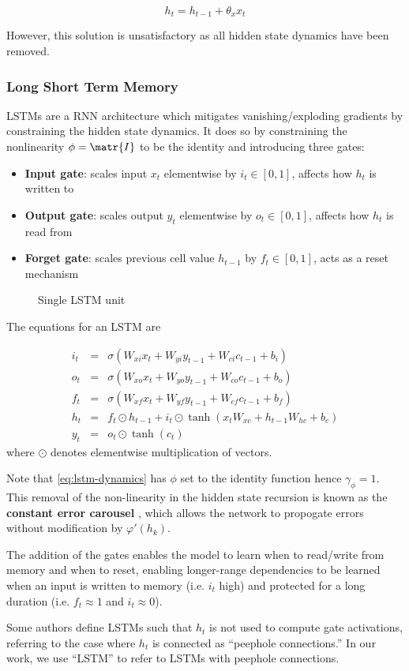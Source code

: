 \begin{equation}
    h_t = h_{t-1} + \theta_x x_t
\end{equation}

However, this solution is unsatisfactory as all hidden state dynamics have been
removed.

\subsubsection{Long Short Term Memory}

LSTMs are a RNN architecture which mitigates vanishing/exploding gradients by constraining
the hidden state dynamics. It does so by constraining the nonlinearity $\phi = \matr{I}$ to be the
identity and introducing three gates:
\begin{itemize}
    \item \textbf{Input gate}: scales input $x_t$ elementwise by $i_t \in [0,1]$, affects how $h_t$ is written to
    \item \textbf{Output gate}: scales output $y_t$ elementwise by $o_t \in [0,1]$, affects how $h_t$ is read from
    \item \textbf{Forget gate}: scales previous cell value $h_{t-1}$ by $f_t \in [0,1]$, acts as a reset mechanism
\end{itemize}

\begin{figure}[htpb]
    \centering
    
    \caption{Single LSTM unit}
    \label{fig:lstm-unit}
\end{figure}

The equations for an LSTM are

\begin{eqnarray}
    i_t &=& \sigma(W_{xi} x_t + W_{yi} y_{t-1} + W_{ci} c_{t-1} + b_i) \\
    o_t &=& \sigma(W_{xo} x_t + W_{yo} y_{t-1} + W_{co} c_{t-1} + b_o) \\
    f_t &=& \sigma(W_{xf} x_t + W_{yf} y_{t-1} + W_{cf} c_{t-1} + b_f) \\
    h_t &=& f_t \odot h_{t-1} + i_t \odot \tanh(x_t W_{xc} + h_{t-1} W_{hc} + b_c) \label{eq:lstm-dynamics} \\
    y_t &=& o_t \odot \tanh(c_t)
\end{eqnarray}
where $\odot$ denotes elementwise multiplication of vectors.

Note that \autoref{eq:lstm-dynamics} has $\phi$ set to the identity function
hence $\gamma_\phi = 1$. This removal of the non-linearity in the hidden state
recursion is known as the \textbf{constant error carousel} , which
allows the network to propogate errors without modification by $\varphi'(h_k)$.

The addition of the gates enables the model to learn when to read/write from
memory and when to reset, enabling longer-range dependencies to be learned when
an input is written to memory (i.e. $i_t$ high) and protected for a long
duration (i.e. $f_t \approx 1$ and $i_t \approx 0$).

Some authors define LSTMs such that $h_t$ is not used to compute gate activations,
referring to the case where $h_t$ is connected as ``peephole connections.'' In our
work, we use ``LSTM'' to refer to LSTMs with peephole connections.
